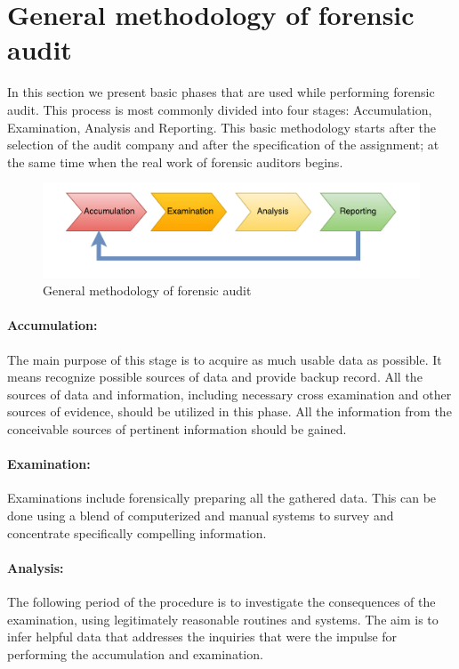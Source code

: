 \section{General methodology of forensic audit}
In this section we present basic phases that are used while performing forensic audit. This process is most commonly divided into four stages: Accumulation, Examination, Analysis and Reporting. This basic methodology starts after the  selection of the audit company and after the specification of the assignment; at the same time when the real work of forensic auditors begins.

\begin{figure}[h]
	\begin{center} 
	\includegraphics[width=1.0\textwidth]{img/general_methodology.pdf}
	\end{center}
	\caption{General methodology of forensic audit}
\end{figure}

\paragraph{Accumulation:} 
The main purpose of this stage is to acquire as much usable data as possible. It means recognize possible sources of data and provide backup record. All the sources of data and information, including necessary cross examination and other sources of evidence, should be utilized in this phase. All the information from the conceivable sources of pertinent information should be gained.

\paragraph{Examination:}
Examinations include forensically preparing all the gathered data. This can be done using a blend of computerized and manual systems to survey and concentrate specifically compelling information. 

\paragraph{Analysis:}
The following period of the procedure is to investigate the consequences of the examination, using legitimately reasonable routines and systems. The aim is to infer helpful data that addresses the inquiries that were the impulse for performing the accumulation and examination. %


